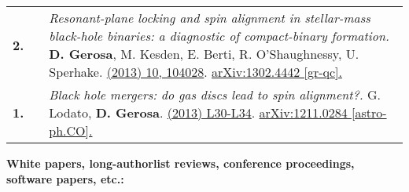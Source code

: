 {\begin{longtable}{rp{0.3cm}p{15.8cm}}
%
\textbf{2.} & & \textit{Resonant-plane locking and spin alignment in stellar-mass black-hole binaries: a diagnostic of compact-binary formation.}
\newline{}
\textbf{D. Gerosa}, M. Kesden, E. Berti, R. O'Shaughnessy, U. Sperhake.
\newline{}
\href{http://dx.doi.org/10.1103/PhysRevD.87.104028}{\prd 87 (2013) 10, 104028}. \href{https://arxiv.org/abs/1302.4442}{arXiv:1302.4442 [gr-qc].}
\vspace{0.09cm}\\
%
\textbf{1.} & & \textit{Black hole mergers: do gas discs lead to spin alignment?.}
\newline{}
G. Lodato, \textbf{D. Gerosa}.
\newline{}
\href{http://dx.doi.org/10.1093/mnrasl/sls018}{\mnrasl 429 (2013) L30-L34}. \href{https://arxiv.org/abs/1211.0284}{arXiv:1211.0284 [astro-ph.CO].}
\vspace{0.09cm}\\
%
\end{longtable} }
\textcolor{color1}{\textbf{White papers, long-authorlist reviews, conference proceedings, software papers, etc.:}}
\vspace{-0.5cm}

